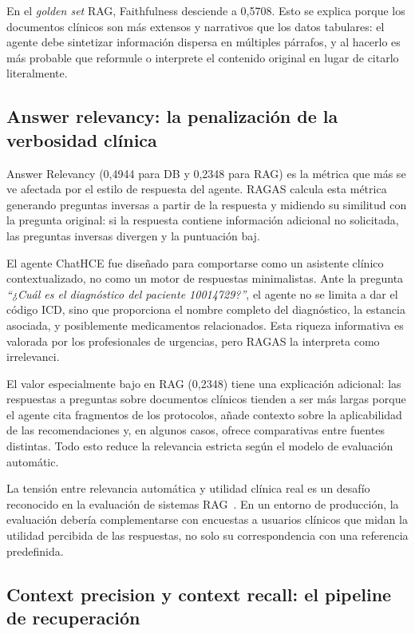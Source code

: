 En el \textit{golden set} \ac{RAG}, Faithfulness desciende a 0,5708. Esto se explica porque los documentos clínicos son más extensos y narrativos que los datos tabulares: el agente debe sintetizar información dispersa en múltiples párrafos, y al hacerlo es más probable que reformule o interprete el contenido original en lugar de citarlo literalmente.


\subsection{Answer relevancy: la penalización de la verbosidad clínica}

Answer Relevancy (0,4944 para DB y 0,2348 para \ac{RAG}) es la métrica que más se ve afectada por el estilo de respuesta del agente. \ac{RAGAS} calcula esta métrica generando preguntas inversas a partir de la respuesta y midiendo su similitud con la pregunta original: si la respuesta contiene información adicional no solicitada, las preguntas inversas divergen y la puntuación baj.

El agente ChatHCE fue diseñado para comportarse como un asistente clínico contextualizado, no como un motor de respuestas minimalistas. Ante la pregunta \textit{``¿Cuál es el diagnóstico del paciente 10014729?''}, el agente no se limita a dar el código \ac{ICD}, sino que proporciona el nombre completo del diagnóstico, la estancia asociada, y posiblemente medicamentos relacionados. Esta riqueza informativa es valorada por los profesionales de urgencias, pero \ac{RAGAS} la interpreta como irrelevanci.

El valor especialmente bajo en \ac{RAG} (0,2348) tiene una explicación adicional: las respuestas a preguntas sobre documentos clínicos tienden a ser más largas porque el agente cita fragmentos de los protocolos, añade contexto sobre la aplicabilidad de las recomendaciones y, en algunos casos, ofrece comparativas entre fuentes distintas. Todo esto reduce la relevancia estricta según el modelo de evaluación automátic.

La tensión entre relevancia automática y utilidad clínica real es un desafío reconocido en la evaluación de sistemas \ac{RAG}~\parencite{Neha2025raghealth}. En un entorno de producción, la evaluación debería complementarse con encuestas a usuarios clínicos que midan la utilidad percibida de las respuestas, no solo su correspondencia con una referencia predefinida.


\subsection{Context precision y context recall: el pipeline de recuperación}

